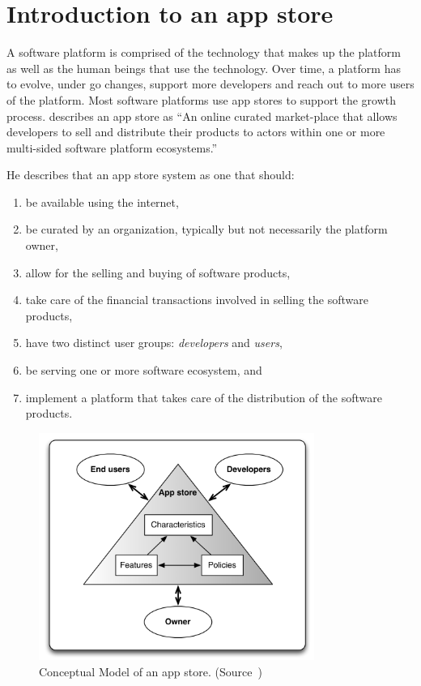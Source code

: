 \section{Introduction to an app store}
\label{sec:introduction_to_an_app_store}

A software platform is comprised of the technology that makes up the platform as well as the human beings that use the technology. Over time, a platform has to evolve, under go changes, support more developers and reach out to more users of the platform. Most software platforms use app stores to support the growth process. \cite{Jansen} describes an app store as ``An online curated market-place that allows developers to sell and distribute their products to actors within one or more multi-sided software platform ecosystems.''

He describes that an app store system as one that should:

\begin{enumerate}
  \item be available using the internet,
  \item be curated by an organization, typically but not necessarily the platform owner,
  \item allow for the selling and buying of software products,
  \item take care of the financial transactions involved in selling the software products,
  \item have two distinct user groups: \emph{developers} and \emph{users},
  \item be serving one or more software ecosystem, and
  \item implement a platform that takes care of the distribution of the software products.
\end{enumerate}

\begin{figure}
  \centering
  \includegraphics[width=9cm]{figures/app_store_triangle.png}
  \caption{Conceptual Model of an app store. (Source~\cite{Jansen})}
  \label{fig:conceptual_model_of_app_store}
\end{figure}

